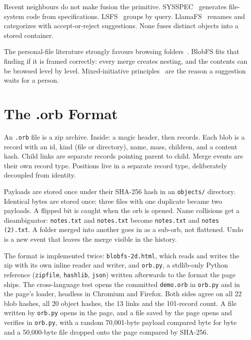 \documentclass[11pt]{article}
\begin{document}
Recent neighbours do not make fusion the primitive.
SYSSPEC~\cite{liu2026} generates file-system code from specifications.
LSFS~\cite{shi2025} groups by query.
LlamaFS~\cite{llamafs2024} renames and categorizes with accept-or-reject suggestions.
None fuses distinct objects into a stored container.

The personal-file literature strongly favours browsing folders~\cite{bergman2016,bergman2013}.
BlobFS fits that finding if it is framed correctly: every merge creates nesting, and the contents can be browsed level by level.
Mixed-initiative principles~\cite{horvitz1999,amershi2019} are the reason a suggestion waits for a person.

\section{The .orb Format}

An \texttt{.orb} file is a zip archive.
Inside: a magic header, then records.
Each blob is a record with an id, kind (file or directory), name, mass, children, and a content hash.
Child links are separate records pointing parent to child.
Merge events are their own record type.
Positions live in a separate record type, deliberately decoupled from identity.

Payloads are stored once under their SHA-256 hash in an \texttt{objects/} directory.
Identical bytes are stored once: three files with one duplicate became two payloads.
A flipped bit is caught when the orb is opened.
Name collisions get a disambiguator: \texttt{notes.txt} and \texttt{notes.txt} become \texttt{notes.txt} and \texttt{notes (2).txt}.
A folder merged into another goes in as a sub-orb, not flattened.
Undo is a new event that leaves the merge visible in the history.

The format is implemented twice: \texttt{blobfs-2d.html}, which reads and writes the zip with its own inline reader and writer, and \texttt{orb.py}, a stdlib-only Python reference (\texttt{zipfile}, \texttt{hashlib}, \texttt{json}) written afterwards to the format the page ships.
The cross-language test opens the committed \texttt{demo.orb} in \texttt{orb.py} and in the page's loader, headless in Chromium and Firefox.
Both sides agree on all 22 blob hashes, all 20 object hashes, the 13 links and the 101-record count.
A file written by \texttt{orb.py} opens in the page, and a file saved by the page opens and verifies in \texttt{orb.py}, with a random 70,001-byte payload compared byte for byte and a 50,000-byte file dropped onto the page compared by SHA-256.
\end{document}
